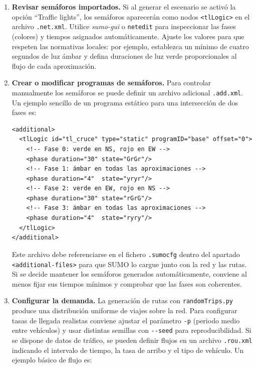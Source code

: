 \begin{enumerate}
  \item \textbf{Revisar semáforos importados.} Si al generar el
    escenario se activó la opción ``Traffic lights'', los semáforos
    aparecerán como nodos \verb|<tlLogic>| en el archivo
    \texttt{.net.xml}. Utilice \emph{sumo-gui} o \texttt{netedit}
    para inspeccionar las fases (colores) y tiempos asignados
    automáticamente. Ajuste los valores para que respeten las
    normativas locales: por ejemplo, establezca un mínimo de cuatro
    segundos de luz ámbar y defina duraciones de luz verde
    proporcionales al flujo de cada aproximación.

  \item \textbf{Crear o modificar programas de semáforos.} Para
    controlar manualmente los semáforos se puede definir un archivo
    adicional \texttt{.add.xml}. Un ejemplo sencillo de un programa
    estático para una intersección de dos fases es:

\begin{verbatim}
<additional>
  <tlLogic id="tl_cruce" type="static" programID="base" offset="0">
    <!-- Fase 0: verde en NS, rojo en EW -->
    <phase duration="30" state="GrGr"/>
    <!-- Fase 1: ámbar en todas las aproximaciones -->
    <phase duration="4"  state="yryr"/>
    <!-- Fase 2: verde en EW, rojo en NS -->
    <phase duration="30" state="rGrG"/>
    <!-- Fase 3: ámbar en todas las aproximaciones -->
    <phase duration="4"  state="ryry"/>
  </tlLogic>
</additional>
\end{verbatim}

    Este archivo debe referenciarse en el fichero \texttt{.sumocfg}
    dentro del apartado \verb|<additional-files>| para que SUMO lo
    cargue junto con la red y las rutas. Si se decide mantener los
    semáforos generados automáticamente, conviene al menos fijar sus
    tiempos mínimos y comprobar que las fases son coherentes.

  \item \textbf{Configurar la demanda.} La generación de rutas con
    \verb|randomTrips.py| produce una distribución uniforme de viajes
    sobre la red. Para configurar tasas de llegada realistas
    conviene ajustar el parámetro \verb|-p| (periodo medio entre
    vehículos) y usar distintas semillas con \verb|--seed| para
    reproducibilidad. Si se dispone de datos de tráfico, se pueden
    definir flujos en un archivo \texttt{.rou.xml} indicando el
    intervalo de tiempo, la tasa de arribo y el tipo de vehículo. Un
    ejemplo básico de flujo es:


\end{enumerate}
